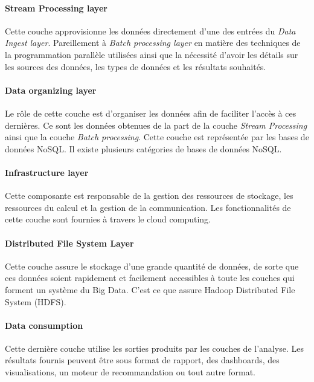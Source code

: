 		
		\paragraph{Stream Processing layer} Cette couche approvisionne les données directement d'une des entrées du \textit{Data Ingest layer}. Pareillement  à  \textit{Batch processing layer} en matière  des techniques de la programmation parallèle utilisées ainsi que la nécessité d'avoir les détails sur les sources des données, les types de données et les résultats souhaités.
		
		
		\paragraph{Data organizing layer} Le rôle de cette couche est d'organiser les données afin de faciliter l'accès à ces dernières. Ce sont les  données obtenues  de la part de la  couche  \textit{Stream Processing} ainsi que la couche \textit{Batch processing}. Cette couche est représentée par les bases de données NoSQL. Il existe plusieurs catégories de bases de données NoSQL.
		
		\paragraph{Infrastructure layer} Cette composante est responsable de la gestion des ressources de stockage, les ressources du calcul et la gestion de la communication. 
		Les fonctionnalités de cette couche sont fournies à travers le cloud computing.
		
		\paragraph{Distributed File System Layer} Cette couche assure le stockage d'une grande quantité de données, de sorte que ces données soient rapidement et facilement accessibles à toute les couches qui forment un système du Big Data. C'est ce que assure Hadoop Distributed File System (HDFS).
		
		\paragraph{Data consumption} Cette dernière couche utilise les sorties produits par les couches de l'analyse. Les résultats fournis peuvent être sous format de rapport, des dashboards, des visualisations, un moteur de recommandation ou tout autre format.
		
		
		
